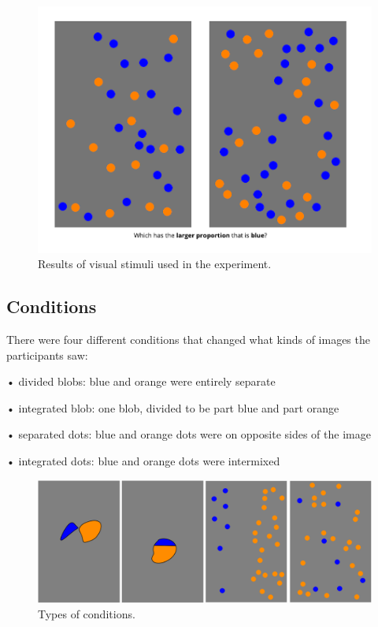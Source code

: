 \documentclass[
  man,floatsintext]{apa6}
\begin{document}
\begin{figure}
\centering
\includegraphics{images_WA10/Probtask_Trial.png}
\caption{\label{fig:graphicone}Results of visual stimuli used in the experiment.}
\end{figure}

\newpage

\subsection{Conditions}\label{conditions}

There were four different conditions that changed what kinds of
images the participants saw:

• divided blobs: blue and orange were entirely separate

• integrated blob: one blob, divided to be part blue and part orange

• separated dots: blue and orange dots were on opposite sides of
the image

• integrated dots: blue and orange dots were intermixed

\begin{figure}
\centering
\includegraphics{../Assignment10/images_WA10/Probtask_formats.png}
\caption{\label{fig:graphictwo}Types of conditions.}
\end{figure}
\end{document}
